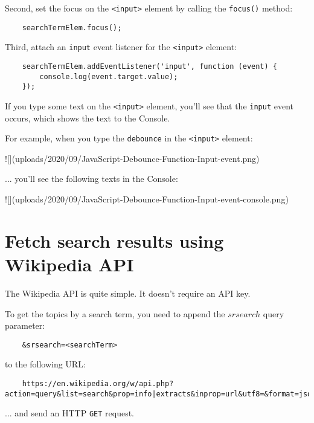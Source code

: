 \documentclass[11pt]{article}
\begin{document}
\noindent
Second, set the focus on the \verb|<input>| element by calling the
\verb|focus()| method:

\begin{lstlisting}
    searchTermElem.focus();
\end{lstlisting}

\noindent
Third, attach an \verb|input| event listener for the \verb|<input>| element:

\begin{lstlisting}
    searchTermElem.addEventListener('input', function (event) {
        console.log(event.target.value);
    });
\end{lstlisting}

\noindent
If you type some text on the \verb|<input>| element, you'll see that the
\verb|input| event occurs, which shows the text to the Console.
\newline

\noindent
For example, when you type the \verb|debounce| in the \verb|<input>| element:

![](uploads/2020/09/JavaScript-Debounce-Function-Input-event.png)

\noindent
... you'll see the following texts in the Console:

![](uploads/2020/09/JavaScript-Debounce-Function-Input-event-console.png)

\section*{Fetch search results using Wikipedia API}

The Wikipedia API is quite simple. It doesn't require an API key.
\newline

\noindent
To get the topics by a search term, you need to append the $srsearch$
query parameter:

\begin{lstlisting}
    &srsearch=<searchTerm>
\end{lstlisting}

\noindent
to the following URL:

\begin{lstlisting}
    https://en.wikipedia.org/w/api.php?action=query&list=search&prop=info|extracts&inprop=url&utf8=&format=json&origin=*&srlimit=10
\end{lstlisting}

\noindent
... and send an HTTP \verb|GET| request.
\newline
\end{document}
